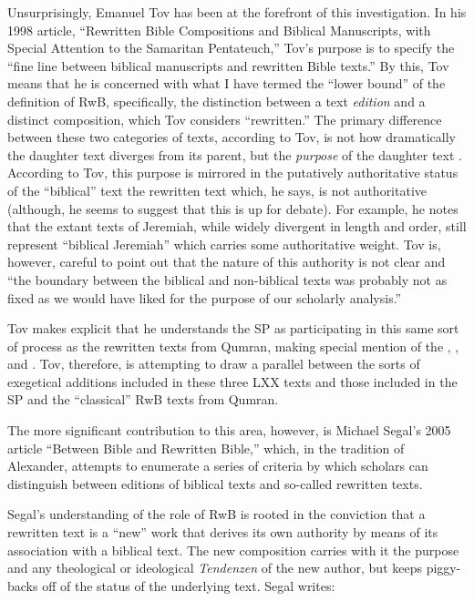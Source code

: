  Unsurprisingly, Emanuel Tov has been at the forefront of this investigation. In his 1998 article, ``Rewritten Bible Compositions and Biblical Manuscripts, with Special Attention to the Samaritan Pentateuch,'' Tov's purpose is to specify the ``fine line between biblical manuscripts and rewritten Bible texts.''\autocite[334]{tov_dsd1998} By this, Tov means that he is concerned with what I have termed the ``lower bound'' of the definition of RwB, specifically, the distinction between a text \emph{edition} and a distinct composition, which Tov considers ``rewritten.'' The primary difference between these two categories of texts, according to Tov, is not how dramatically the daughter text diverges from its parent, but the \emph{purpose} of the daughter text \autocite[334]{tov_dsd1998}. According to Tov, this purpose is mirrored in the putatively authoritative status of the ``biblical'' text \visavis the rewritten text which, he says, is not authoritative (although, he seems to suggest that this is up for debate\autocite[337]{tov_dsd1998}). For example, he notes that the extant texts of Jeremiah, while widely divergent in length and order, still represent ``biblical Jeremiah'' which carries some authoritative weight. Tov is, however, careful to point out that the nature of this authority is not clear and ``the boundary between the biblical and non-biblical texts was probably not as fixed as we would have liked for the purpose of our scholarly analysis.''\autocite[335]{tov_dsd1998} 

 Tov makes explicit that he understands the SP as participating in this same sort of process as the rewritten texts from Qumran, making special mention of the \templescroll, \ga, and \jub. Tov, therefore, is attempting to draw a parallel between the sorts of exegetical additions included in these three LXX texts and those included in the SP and the ``classical'' RwB texts from Qumran. 

 The more significant contribution to this area, however, is Michael Segal's 2005 article ``Between Bible and Rewritten Bible,'' which, in the tradition of Alexander, attempts to enumerate a series of criteria by which scholars can distinguish between editions of biblical texts and so-called rewritten texts. 

 Segal's understanding of the role of RwB is rooted in the conviction that a rewritten text is a ``new'' work that derives its own authority by means of its association with a biblical text. The new composition carries with it the purpose and any theological or ideological \emph{Tendenzen} of the new author, but keeps piggy-backs off of the status of the underlying text.\autocite[11]{segal_henze2005} Segal writes: 

